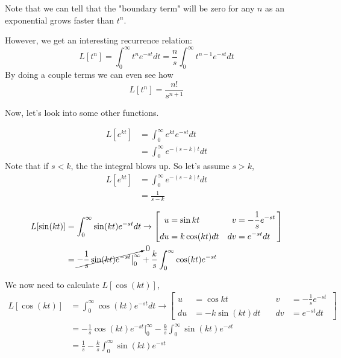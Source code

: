 Note that we can tell that the "boundary term" will be zero for any $n$ as an exponential grows
faster than $t^n$.

However, we get an interesting recurrence relation:
$$
L[t^n] = \int_{0}^{\infty} t^n e^{-st} dt = \frac{n}{s} \int_{0}^{\infty} t^{n-1} e^{-st} dt
$$
By doing a couple terms we can even see how
$$
L[t^n] = \frac{n!}{s^{n+1}}
$$


Now, let's look into some other functions.

\begin{align*}
L[ e^{kt} ] &= \int_{0}^{\infty} e^{kt} e^{-st} dt \\
&= \int_{0}^{\infty} e^{-(s-k)t} dt
\end{align*}
Note that if $s < k$, the the integral blows up.
So let's assume $s>k$,
\begin{align*}
L[ e^{kt} ] &= \int_{0}^{\infty} e^{-(s-k)t} dt \\
&= \frac{1}{s-k}
\end{align*}


\begin{align*}
L[ \sin(kt) ] &= \int_{0}^{\infty} \sin(kt) e^{-st} dt \rightarrow
\left[
    \begin{alignedat}{2}
    u  &= \sin kt         \quad & v  &= -\frac{1}{s} e^{-st} \\
    du &= k \cos (kt) dt    \quad & dv &= e^{-st} dt 
    \end{alignedat}\,
\right] \\
&= \cancelto{0}{ -\frac{1}{s} \sin (kt) e^{-st} \big|_{0}^{\infty} } +
    \frac{k}{s} \int_{0}^{\infty} \cos (kt) e^{-st}
\end{align*}

We now need to calculate $L[ \cos(kt) ]$,
\begin{align*}
L[ \cos(kt) ] &= \int_{0}^{\infty} \cos(kt) e^{-st} dt \rightarrow
\left[
    \begin{alignedat}{2}
    u  &= \cos kt         \quad & v  &= -\frac{1}{s} e^{-st} \\
    du &= -k \sin (kt) dt    \quad & dv &= e^{-st} dt 
    \end{alignedat}\,
\right] \\
&= -\frac{1}{s} \cos (kt) e^{-st} \big|_{0}^{\infty}
    - \frac{k}{s} \int_{0}^{\infty} \sin (kt) e^{-st} \\
&= \frac{1}{s} - \frac{k}{s} \int_{0}^{\infty} \sin (kt) e^{-st}
\end{align*}

